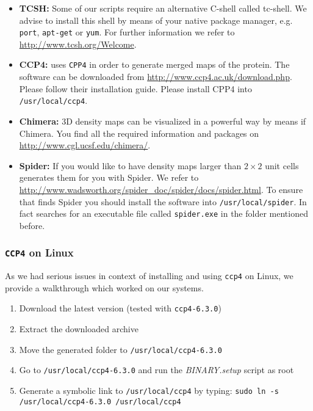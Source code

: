 \begin{itemize}
	\item \textbf{TCSH:} Some of our scripts require an alternative C-shell called tc-shell. We advise to install this shell by means of your native package manager, e.g. \texttt{port}, \texttt{apt-get} or \texttt{yum}. For further information we refer to \url{http://www.tcsh.org/Welcome}.
	\item \textbf{CCP4:} {\twodx} uses \texttt{CPP4} in order to generate merged maps of the protein. The software can be downloaded from \url{http://www.ccp4.ac.uk/download.php}. Please follow their installation guide. Please install CPP4 into \texttt{/usr/local/ccp4}.
	\item \textbf{Chimera:} 3D density maps can be visualized in a powerful way by means if Chimera. You find all the required information and packages on \url{http://www.cgl.ucsf.edu/chimera/}.
	\item \textbf{Spider:} If you would like to have density maps larger than $2\times 2$ unit cells {\twodx} generates them for you with Spider. We refer to \url{http://www.wadsworth.org/spider_doc/spider/docs/spider.html}. To ensure that {\twodx} finds Spider you should install the software into \texttt{/usr/local/spider}. In fact {\twodx} searches for an executable file called \texttt{spider.exe} in the folder mentioned before.
\end{itemize}

\newpage

\subsubsection{\texttt{CCP4} on Linux}
As we had serious issues in context of installing and using \texttt{ccp4} on Linux, we provide a walkthrough which worked on our systems. 
\begin{enumerate}
	\item Download the latest version (tested with \texttt{ccp4-6.3.0})
	\item Extract the downloaded archive
	\item Move the generated folder to \texttt{/usr/local/ccp4-6.3.0}
	\item Go to \texttt{/usr/local/ccp4-6.3.0} and run the \textit{BINARY.setup} script as root
	\item Generate a symbolic link to \texttt{/usr/local/ccp4} by typing: \newline \texttt{sudo ln -s /usr/local/ccp4-6.3.0 /usr/local/ccp4}
\end{enumerate}

